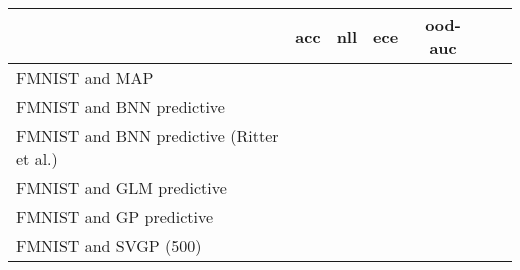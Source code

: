 \begin{tabular}{l C{0.6\tblw} C{0.6\tblw} C{0.6\tblw} C{0.6\tblw} C{0.6\tblw}  C{0.6\tblw}}
\toprule
& acc & nll & ece & ood-auc  \\
\midrule
\sc FMNIST and MAP &  &  &  &  \\
\sc FMNIST and BNN predictive &  &  &  &  \\
\sc FMNIST and BNN predictive (Ritter et al.) &  &  &  &  \\
\sc FMNIST and GLM predictive &  &  &  &  \\
\sc FMNIST and GP predictive &  &  &  &  \\
\sc FMNIST and SVGP (500) &  &  &  &  \\
\bottomrule
\end{tabular}
